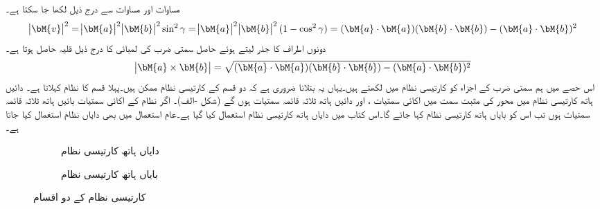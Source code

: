 مساوات  اور مساوات  سے درج ذیل لکھا جا سکتا ہے۔
\begin{align*}
\abs{\bM{v}}^2=\abs{\bM{a}}^2\abs{\bM{b}}^2\sin^2\gamma=\abs{\bM{a}}^2\abs{\bM{b}}^2(1-\cos^2\gamma)=(\bM{a}\cdot\bM{a})(\bM{b}\cdot\bM{b})-(\bM{a}\cdot\bM{b})^2
\end{align*}
دونوں اطراف کا جذر لیتے ہوئے حاصل سمتی ضرب کی لمبائی کا درج ذیل قلیہ حاصل ہوتا ہے۔
\begin{align}\label{مساوات_الجبرا_سمتی_ضرب_معیار_کی_اہم_مساوات}
\abs{\bM{a}\times \bM{b}}=\sqrt{(\bM{a}\cdot\bM{a})(\bM{b}\cdot\bM{b})-(\bM{a}\cdot\bM{b})^2}
\end{align}
اس حصے میں ہم سمتی ضرب کے اجزاء کو کارتیسی نظام میں لکھتے ہیں۔یہاں یہ بتلانا ضروری ہے کہ دو قسم کے کارتیسی نظام ممکن ہیں۔پہلا قسم   کا نظام کہلاتا ہے۔ دائیں ہاتھ کارتیسی نظام میں محور کی مثبت سمت میں اکائی سمتیات ،  اور  دائیں ہاتھ ثلاثہ قائمہ سمتیات ہوں گے (شکل -الف)۔ اگر نظام کے اکائی سمتیات بائیں ہاتھ ثلاثہ قائمہ سمتیات ہوں تب اس کو بایاں ہاتھ کارتیسی نظام کہا جائے گا۔اس کتاب میں دایاں ہاتھ کارتیسی نظام استعمال کیا گیا ہے۔عام استعمال میں بھی دایاں نظام استعمال کیا جاتا ہے۔ 
\begin{figure}
\centering
\begin{subfigure}{0.45\textwidth}
\centering
{}
\caption{ دایاں ہاتھ کارتیسی نظام}
\end{subfigure} \hfill
\begin{subfigure}{0.45\textwidth}
\centering
{}
\caption{ بایاں ہاتھ کارتیسی نظام}
\end{subfigure}
\caption{کارتیسی نظام کے دو اقسام}
\label{شکل_الجبرا_کارتیسی_بایاں_دایاں_نظام}
\end{figure}

